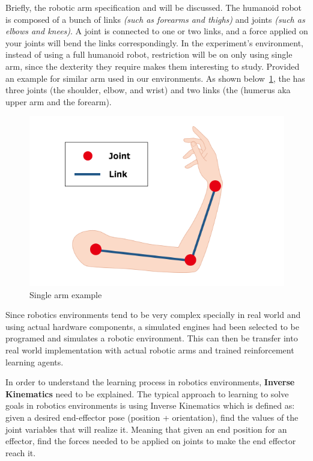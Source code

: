 Briefly, the robotic arm specification and will be discussed. The humanoid robot is composed of a bunch of links \textit{(such as forearms and thighs)} and joints \textit{ (such as elbows and knees)}. A joint is connected to one or two links, and a force applied on your joints will bend the links correspondingly. In the experiment's environment, instead of using a full humanoid robot, restriction will be on only using single arm, since the dexterity they require makes them interesting to study. 
Provided an example for similar arm used in our environments. As shown below~\ref{fig:arm}, the has three joints (the shoulder, elbow, and wrist) and two links (the (humerus aka upper arm and the forearm).

\begin{figure}[!htb]
	\centering
		\includegraphics[width=\linewidth]{figures/arm.png}
		\caption{Single arm example}
		\label{fig:arm}
\end{figure}

Since robotics environments tend to be very complex specially in real world and using actual hardware components, a simulated engines had been selected to be programed and simulates a robotic environment. This can then be transfer into real world implementation with actual robotic arms and trained reinforcement learning agents. 

In order to understand the learning process in robotics environments, \textbf{Inverse Kinematics} need to be explained. The typical approach to learning to solve goals in robotics environments is using Inverse Kinematics which is defined as: given a desired end-effector pose (position + orientation), find the values of the joint variables that will realize it. Meaning that given an end position for an effector, find the forces needed to be applied on joints to make the end effector reach it.

